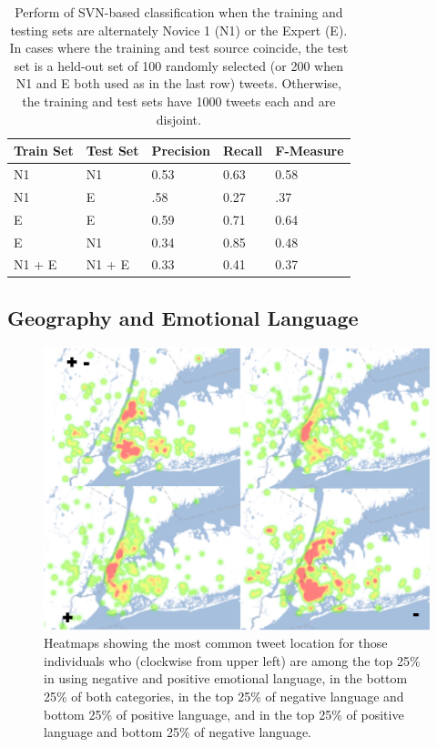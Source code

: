 \documentclass[11pt]{article}
\begin{document}
\begin{table}[h]
\small
\begin{tabular}{|l|l|l|l|l|}
\hline
Train Set         & Test Set          & Precision & Recall & F-Measure \\ \hline
N1          & N1          & 0.53      & 0.63   & 0.58      \\ \hline
N1          & E & .58       & 0.27   & .37       \\ \hline
E           & E     & 0.59      & 0.71   & 0.64      \\ \hline
E            & N1          & 0.34      & 0.85   & 0.48      \\ \hline
N1 + E & N1 + E & 0.33      & 0.41   &  0.37         \\ \hline
\end{tabular}
\caption{Perform of SVN-based classification when the training and testing sets are alternately Novice 1 (N1) or the Expert (E). In cases where the training and test source coincide, the test set is a held-out set of 100 randomly selected (or 200 when N1 and E both used as in the last row) tweets. Otherwise, the training and test sets have 1000 tweets each and are disjoint.}
\end{table}

\subsection{Geography and Emotional Language}
\begin{figure}
  \centering
  \includegraphics[scale=.4]{nyc-emo.pdf}
  \caption{Heatmaps showing the most common tweet location for those individuals who (clockwise from upper left) are among the top 25\% in using negative and positive emotional language, in the bottom 25\%  of both categories, in the top 25\% of negative language and bottom 25\% of positive language, and in the top 25\% of positive language and bottom 25\% of negative language.}
  \label{fig:geo}
\end{figure}
\end{document}
